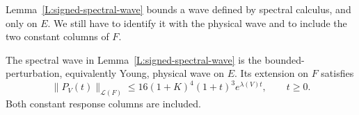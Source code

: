Lemma~\ref{L:signed-spectral-wave} bounds a wave defined by spectral
calculus, and only on $E$. We still have to identify it with the physical wave
and to include the two constant columns of $F$.

\begin{proposition}
  \label{P:signed-physical-wave}
  The spectral wave in Lemma~\ref{L:signed-spectral-wave} is the
  bounded-perturbation, equivalently Young, physical wave on $E$. Its extension
  on $F$ satisfies
  \begin{equation}\label{E:signed-F-wave}
    \|P_V(t)\|_{\mathcal{L}(F)}
    \le16(1+K)^4(1+t)^3e^{\lambda(V)t},\qquad t\ge0.
  \end{equation}
  Both constant response columns are included.
\end{proposition}

